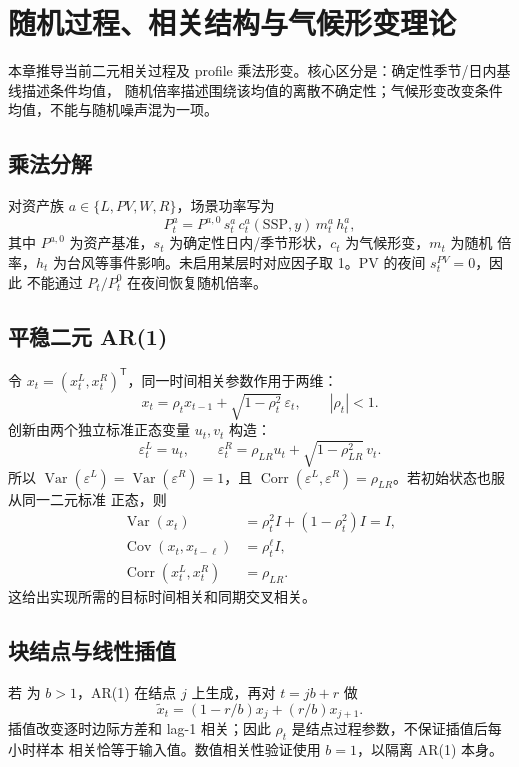\section{随机过程、相关结构与气候形变理论}
\label{sec:scenario-stochastic-theory}

\begin{theorynote}
本章推导当前二元相关过程及 profile 乘法形变。核心区分是：确定性季节/日内基线描述条件均值，
随机倍率描述围绕该均值的离散不确定性；气候形变改变条件均值，不能与随机噪声混为一项。
\end{theorynote}

\subsection{乘法分解}
对资产族 $a\in\{L,PV,W,R\}$，场景功率写为
\begin{equation}
 P^a_t=P^{a,0}\,s^a_t\,c^a_t(\mathrm{SSP},y)\,m^a_t\,h^a_t,
\end{equation}
其中 $P^{a,0}$ 为资产基准，$s_t$ 为确定性日内/季节形状，$c_t$ 为气候形变，$m_t$ 为随机
倍率，$h_t$ 为台风等事件影响。未启用某层时对应因子取 1。PV 的夜间 $s^{PV}_t=0$，因此
不能通过 $P_t/P^0_t$ 在夜间恢复随机倍率。

\subsection{平稳二元 AR(1)}
令 $x_t=(x^L_t,x^R_t)^\mathsf T$，同一时间相关参数作用于两维：
\begin{equation}
 x_t=\rho_t x_{t-1}+\sqrt{1-\rho_t^2}\,\varepsilon_t,
 \qquad |\rho_t|<1.
\end{equation}
创新由两个独立标准正态变量 $u_t,v_t$ 构造：
\begin{equation}
 \varepsilon^L_t=u_t,\qquad
 \varepsilon^R_t=\rho_{LR}u_t+\sqrt{1-\rho_{LR}^2}\,v_t.
\end{equation}
所以 $\operatorname{Var}(\varepsilon^L)=\operatorname{Var}(\varepsilon^R)=1$，且
$\operatorname{Corr}(\varepsilon^L,\varepsilon^R)=\rho_{LR}$。若初始状态也服从同一二元标准
正态，则
\begin{align}
 \operatorname{Var}(x_t)&=\rho_t^2 I+(1-\rho_t^2)I=I,\\
 \operatorname{Cov}(x_t,x_{t-\ell})&=\rho_t^\ell I,\\
 \operatorname{Corr}(x^L_t,x^R_t)&=\rho_{LR}.
\end{align}
这给出实现所需的目标时间相关和同期交叉相关。

\subsection{块结点与线性插值}
若  为 $b>1$，AR(1) 在结点 $j$ 上生成，再对 $t=jb+r$ 做
\begin{equation}
 \widetilde x_t=(1-r/b)x_j+(r/b)x_{j+1}.
\end{equation}
插值改变逐时边际方差和 lag-1 相关；因此 $\rho_t$ 是结点过程参数，不保证插值后每小时样本
相关恰等于输入值。数值相关性验证使用 $b=1$，以隔离 AR(1) 本身。

